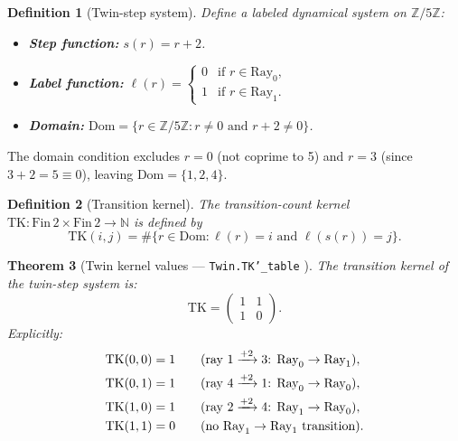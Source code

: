 \documentclass[11pt,a4paper]{article}
\newtheorem{theorem}{Theorem}[section]
\newtheorem{definition}[theorem]{Definition}
\newcommand{\Z}{\mathbb{Z}}
\newcommand{\N}{\mathbb{N}}
\newcommand{\Fin}{\mathrm{Fin}}
\newcommand{\lean}[1]{\texttt{\small #1}}
\newcommand{\verified}{\textcolor{green!60!black}{\checkmark}}
\begin{document}
\begin{definition}[Twin-step system]\label{def:twin}
  Define a labeled dynamical system on $\Z/5\Z$:
  \begin{itemize}
    \item \textbf{Step function:} $s(r) = r + 2$.
    \item \textbf{Label function:} $\ell(r) = \begin{cases} 0 & \text{if } r \in \mathrm{Ray}_0, \\ 1 & \text{if } r \in \mathrm{Ray}_1. \end{cases}$
    \item \textbf{Domain:} $\mathrm{Dom} = \{r \in \Z/5\Z : r \neq 0 \text{ and } r + 2 \neq 0\}$.
  \end{itemize}
\end{definition}

The domain condition excludes $r = 0$ (not coprime to 5) and $r = 3$
(since $3 + 2 = 5 \equiv 0$), leaving $\mathrm{Dom} = \{1, 2, 4\}$.

\begin{definition}[Transition kernel]\label{def:kernel}
  The \emph{transition-count kernel} $\mathrm{TK} : \Fin\,2 \times \Fin\,2 \to \N$ is defined by
  \[
    \mathrm{TK}(i, j) = \#\{r \in \mathrm{Dom} : \ell(r) = i \text{ and } \ell(s(r)) = j\}.
  \]
\end{definition}

\begin{theorem}[Twin kernel values --- \lean{Twin.TK'\_table} \verified]\label{thm:TK}
  The transition kernel of the twin-step system is:
  \[
    \mathrm{TK} = \begin{pmatrix} 1 & 1 \\ 1 & 0 \end{pmatrix}.
  \]
  Explicitly:
  \begin{align}
    \mathrm{TK}(0,0) &= 1 &\quad& \text{(ray $1 \xrightarrow{+2} 3$: Ray}_0 \to \text{Ray}_1\text{)}, \notag \\
    \mathrm{TK}(0,1) &= 1 &\quad& \text{(ray $4 \xrightarrow{+2} 1$: Ray}_0 \to \text{Ray}_0\text{)}, \notag \\
    \mathrm{TK}(1,0) &= 1 &\quad& \text{(ray $2 \xrightarrow{+2} 4$: Ray}_1 \to \text{Ray}_0\text{)}, \notag \\
    \mathrm{TK}(1,1) &= 0 &\quad& \text{(no Ray}_1 \to \text{Ray}_1\text{ transition)}.
  \end{align}
\end{theorem}
\end{document}
